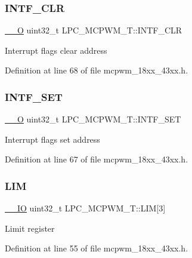 \subsubsection{\texorpdfstring{I\+N\+T\+F\+\_\+\+C\+LR}{INTF\_CLR}}
{\footnotesize\ttfamily \hyperlink{core__sc300_8h_a7e25d9380f9ef903923964322e71f2f6}{\+\_\+\+\_\+O} uint32\+\_\+t L\+P\+C\+\_\+\+M\+C\+P\+W\+M\+\_\+\+T\+::\+I\+N\+T\+F\+\_\+\+C\+LR}

Interrupt flags clear address 

Definition at line 68 of file mcpwm\+\_\+18xx\+\_\+43xx.\+h.

\mbox{\label{struct_l_p_c___m_c_p_w_m___t_a4c129a22156572b5671ff0e8b9f1977d}} 
\subsubsection{\texorpdfstring{I\+N\+T\+F\+\_\+\+S\+ET}{INTF\_SET}}
{\footnotesize\ttfamily \hyperlink{core__sc300_8h_a7e25d9380f9ef903923964322e71f2f6}{\+\_\+\+\_\+O} uint32\+\_\+t L\+P\+C\+\_\+\+M\+C\+P\+W\+M\+\_\+\+T\+::\+I\+N\+T\+F\+\_\+\+S\+ET}

Interrupt flags set address 

Definition at line 67 of file mcpwm\+\_\+18xx\+\_\+43xx.\+h.

\mbox{\label{struct_l_p_c___m_c_p_w_m___t_a01c2889381949b5b1f8c2bf8edf9148c}} 
\subsubsection{\texorpdfstring{L\+IM}{LIM}}
{\footnotesize\ttfamily \hyperlink{core__sc300_8h_aec43007d9998a0a0e01faede4133d6be}{\+\_\+\+\_\+\+IO} uint32\+\_\+t L\+P\+C\+\_\+\+M\+C\+P\+W\+M\+\_\+\+T\+::\+L\+IM\mbox{[}3\mbox{]}}

Limit register 

Definition at line 55 of file mcpwm\+\_\+18xx\+\_\+43xx.\+h.

